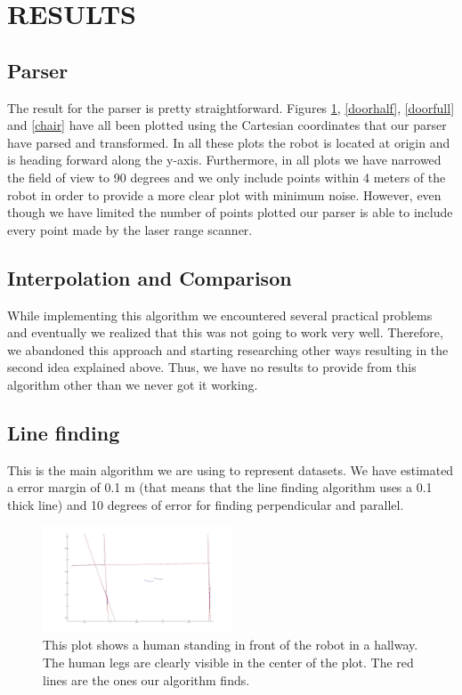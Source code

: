 \documentclass[a4paper, 10pt, conference]{ieeeconf}      %
\begin{document}
\section{RESULTS}


\subsection{Parser}
The result for the parser is pretty straightforward. Figures \ref{human}, \ref{doorhalf}, \ref{doorfull} and \ref{chair} have all been plotted using the Cartesian coordinates that our parser have parsed and transformed. In all these plots the robot is located at origin and is heading forward along the y-axis. Furthermore, in all plots we have narrowed the field of view to 90 degrees and we only include points within 4 meters of the robot in order to provide a more clear plot with minimum noise. However, even though we have limited the number of points plotted our parser is able to include every point made by the laser range scanner.

\subsection{Interpolation and Comparison}
While implementing this algorithm we encountered several practical problems and eventually we realized that this was not going to work very well. Therefore, we abandoned this approach and starting researching other ways resulting in the second idea explained above. Thus, we have no results to provide from this algorithm other than we never got it working.

\subsection{Line finding}
This is the main algorithm we are using to represent datasets. We have estimated a error margin of 0.1 m (that means that the line finding algorithm uses a 0.1 thick line) and 10 degrees of error for finding perpendicular and parallel. 

\begin{figure}
\centering
\includegraphics[width=0.5\textwidth]{presimg/humanlines.jpg}
\caption{This plot shows a human standing in front of the robot in a hallway. The human legs are clearly visible in the center of the plot. The red lines are the ones our algorithm finds.}
\label{human}
\end{figure}
\end{document}
